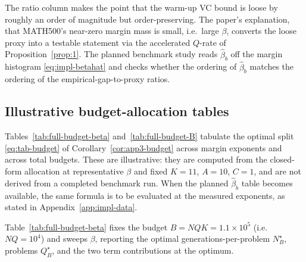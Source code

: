 \documentclass{article} %
\begin{document}
The ratio column makes the point that the warm-up VC bound is loose by roughly an
order of magnitude but order-preserving. The paper's explanation, that
MATH500's near-zero margin mass is small, i.e.\ large $\beta$, converts the
loose proxy into a testable statement via the accelerated $Q$-rate of
Proposition~\ref{prop:1}. The planned benchmark study reads $\widehat\beta_b$
off the margin histogram \eqref{eq:impl-betahat} and checks whether the ordering
of $\widehat\beta_b$ matches the ordering of the empirical-gap-to-proxy ratios.

\subsection{Illustrative budget-allocation tables}
\label{app:tab-budget}

Tables~\ref{tab:full-budget-beta} and~\ref{tab:full-budget-B} tabulate the
optimal split \eqref{eq:tab-budget} of Corollary~\ref{cor:app3-budget} across
margin exponents and across total budgets. These are illustrative: they are
computed from the closed-form allocation at representative $\beta$ and fixed
$K=11$, $A=10$, $C=1$, and are not derived from a completed benchmark run. When
the planned $\widehat\beta_b$ table becomes available, the same formula is to be
evaluated at the measured exponents, as stated in
Appendix~\ref{app:impl-data}.

Table~\ref{tab:full-budget-beta} fixes the budget $B=NQK=1.1\times10^5$ (i.e.\
$NQ=10^4$) and sweeps $\beta$, reporting the optimal generations-per-problem
$N_B^\star$, problems $Q_B^\star$, and the two term contributions at the
optimum.
\end{document}
